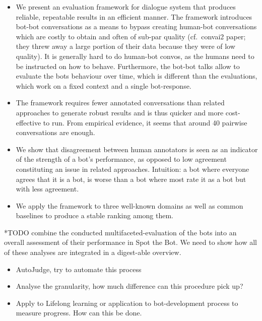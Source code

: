 \documentclass[11pt,a4paper]{article}
\begin{document}
\begin{itemize}
    \item We present an evaluation framework for dialogue system that produces reliable, repeatable results in an efficient manner. The framework introduces bot-bot conversations as a means to bypass creating human-bot conversations which are costly to obtain and often of sub-par quality (cf.\ convai2 paper; they threw away a large portion of their data because they were of low quality). It is generally hard to do human-bot convos, as the humans need to be instructed on how to behave. Furthermore, the bot-bot talks allow to evaluate the bots behaviour over time, which is different than the evaluations, which work on a fixed context and a single bot-response.
    \item The framework requires fewer annotated conversations than related approaches to generate robust results and is thus quicker and more cost-effective to run. From empirical evidence, it seems that around 40 pairwise conversations are enough.
    \item We show that disagreement between human annotators is seen as an indicator of the strength of a bot's performance, as opposed to low agreement constituting an issue in related approaches.
    Intuition: a bot where everyone agrees that it is a bot, is worse than a bot where most rate it as a bot but with less agreement.
    \item We apply the framework to three well-known domains as well as common baselines to produce a stable ranking among them.
\end{itemize}

*TODO combine the conducted multifaceted-evaluation of the bots into an overall assessment of their performance in Spot the Bot. We need to show how all of these analyses are integrated in a digest-able overview.



\begin{itemize}
    \item AutoJudge, try to automate this process
    \item Analyse the granularity, how much difference can this procedure pick up?
    \item Apply to Lifelong learning or application to bot-development process to measure progress. How can this be done.
\end{itemize}
\end{document}
